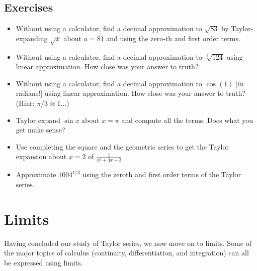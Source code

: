 \documentclass[a4paper]{book}
\begin{document}
\begin{sloppypar}
\subsection{Exercises}
\begin{itemize}
\item Without using a calculator, find a decimal approximation to $\sqrt{83}$ by Taylor-expanding $\sqrt{x}$ about $a=81$ and using the zero-th and first order terms.
\item Without using a calculator, find a decimal approximation to $\sqrt[3]{124}$ using linear approximation. How close was your answer to truth?	
\item Without using a calculator, find a decimal approximation to $\cos(1)$ [in radians!] using linear approximation. How close was your answer to truth? (Hint: $\pi/3\approx 1$...)
\item Taylor expand $\sin x$ about $x=\pi$ and compute all the terms. Does what you get make sense?
\item Use completing the square and the geometric series to get the Taylor expansion about $x=2$ of $\frac{1}{x^2+4x+3}$
\item Approximate $1004^{1/3}$ using the zeroth and first order terms of the Taylor series.
\end{itemize}

\section{Limits} \label{ChFunctionsSecLimits}

Having concluded our study of Taylor series, we now move on to limits. Some of the major topics of calculus (continuity, differentiation, and integration) can all be expressed using limits.


\end{sloppypar}
\end{document}
